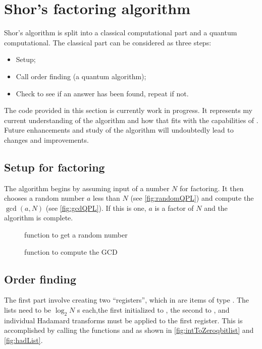 \section{Shor's factoring algorithm}\label{sec:shorsFactoring}
Shor's algorithm is split into a classical computational part and a 
quantum computational.
The classical part can be considered as three steps:
\begin{itemize}
\item{}Setup;
\item{}Call order finding (a quantum algorithm);
\item{}Check to see if an answer has been found, repeat if not.
\end{itemize}

The code provided in this section is currently work in progress. It
represents my current understanding of the algorithm and how that
fits with the capabilities of \lqpl. Future \lqpl{} enhancements and
study of the algorithm will undoubtedly lead to changes and improvements.

\subsection{Setup for factoring}\label{subsec:setupforfactoring}
The algorithm begins by assuming input of a number $N$ for factoring. 
It then chooses a random number $a$ less than $N$ (see
\vref{fig:randomQPL}) and compute the $\gcd(a,N)$ (see \vref{fig:gcdQPL}).
If this is one, $a$ is a factor of $N$ and the algorithm is complete.

\begin{figure}[htbp]

\caption{\lqpl{} function to get a random number}\label{fig:randomQPL}
\end{figure}

\begin{figure}[htbp]

\caption{\lqpl{} function to compute the GCD}\label{fig:gcdQPL}
\end{figure}

\subsection{Order finding}\label{subsec:orderfinding}

The first part involve creating two \qbit{} ``registers'', which in 
\lqpl{} are items of type . 
The lists need to be $\log_2 N$ 
\qbit{}s each,the first initialized to , the
second to , and individual Hadamard transforms must be applied
to the first register. This is accomplished by calling the functions
 and 
 as shown in \ref{fig:intToZeroqbitlist} and
\ref{fig:hadList}.


